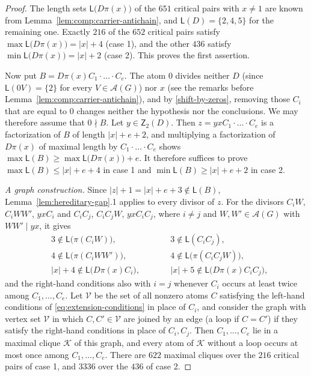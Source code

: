 \documentclass[a4paper, 10pt]{amsart}
\theoremstyle{plain}
\theoremstyle{definition}
\theoremstyle{definition}
\numberwithin{equation}{section}
\begin{document}
\begin{proof}
The length sets $\mathsf L \big( D\pi(x) \big)$ of the $651$ critical pairs with
$x \ne 1$ are known from Lemma~\ref{lem:comp:carrier-antichain}, and
$\mathsf L (D) = \{2,4,5\}$ for the remaining one.  Exactly $216$ of the $652$
critical pairs satisfy $\max \mathsf L \big( D\pi(x) \big)  = |x|+4$ (case 1), and the
other $436$ satisfy $\min \mathsf L \big( D\pi(x) \big) = |x|+2$ (case 2).  This proves
the first assertion.

Now put $B = D\pi(x) C_1 \cdot \ldots \cdot C_e$.  The atom $0$ divides neither
$D$ (since $\mathsf L (0V) = \{2\}$ for every $V \in \mathcal A (G)$) nor $x$
(see the remarks before Lemma~\ref{lem:comp:carrier-antichain}), and by
\eqref{shift-by-zeros}, removing those $C_i$ that are equal to $0$ changes
neither the hypothesis nor the conclusions.  We may therefore assume that
$0 \nmid B$.  Let $y \in \mathsf Z_2 (D)$.  Then
$z = yxC_1 \cdot \ldots \cdot C_e$ is a factorization of $B$ of length
$|x|+e+2$, and multiplying a factorization of $D\pi(x)$ of maximal length by
$C_1 \cdot \ldots \cdot C_e$ shows
$\max \mathsf L (B) \ge \max \mathsf L \big( D\pi(x) \big) + e$.  It therefore suffices
to prove $\max \mathsf L (B) \le |x|+e+4$ in case 1 and
$\min \mathsf L (B) \ge |x|+e+2$ in case 2.

\emph{A graph construction.}  Since $|z|+1 = |x|+e+3 \notin \mathsf L (B)$, 
Lemma~\ref{lem:hereditary-gap}.1 applies to every divisor of $z$.  For the
divisors $C_iW$, $C_iWW'$, $yxC_i$ and $C_iC_j$, $C_iC_jW$, $yxC_iC_j$, where
$i \ne j$ and $W, W' \in \mathcal A (G)$ with $WW' \mid yx$, it gives
\begin{equation}
 \begin{aligned}
 &3 \notin \mathsf L \big( \pi (C_iW) \big), &\qquad
 &3 \notin \mathsf L (C_iC_j),\\
 &4 \notin \mathsf L \big( \pi (C_iWW') \big), &\qquad
 &4 \notin \mathsf L \big( \pi (C_iC_jW) \big),\\
 &|x|+4 \notin \mathsf L \big( D\pi(x)C_i \big), &\qquad
 &|x|+5 \notin \mathsf L \big( D\pi(x)C_iC_j \big),
 \end{aligned}\label{eq:extension-conditions}
\end{equation}
and the right-hand conditions also with $i = j$ whenever $C_i$ occurs at least
twice among $C_1, \ldots, C_e$.  Let $\mathcal V$ be the set of all nonzero
atoms $C$ satisfying the left-hand conditions of
\eqref{eq:extension-conditions} in place of $C_i$, and consider the graph with
vertex set $\mathcal V$ in which $C, C' \in \mathcal V$ are joined by an edge (a
loop if $C = C'$) if they satisfy the right-hand conditions in place of
$C_i, C_j$.  Then
$C_1, \ldots, C_e$ lie in a maximal clique $\mathcal K$ of this graph, and
every atom of $\mathcal K$ without a loop occurs at most once among
$C_1, \ldots, C_e$.  There are $622$ maximal cliques over the $216$ critical
pairs of case 1, and $3336$ over the $436$ of case 2.


\end{proof}
\end{document}
